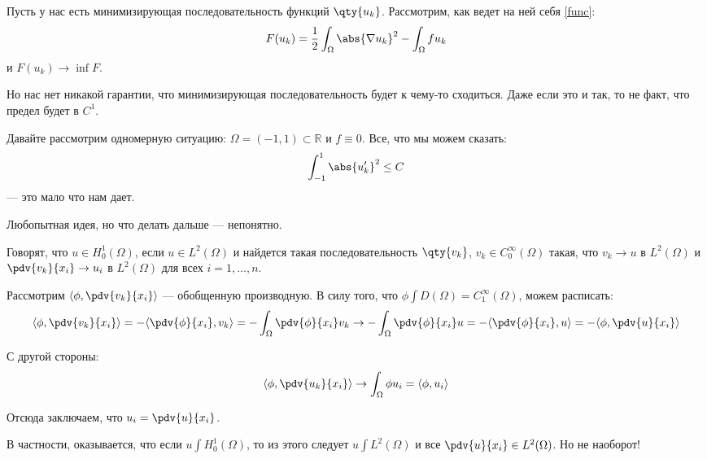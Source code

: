 Пусть у нас есть минимизирующая последовательность функций $\qty{u_k}$. Рассмотрим, как ведет на ней себя \eqref{func}:
\begin{equation}
  F(u_k) = \frac{1}{2} \int_\Omega \abs{\nabla u_k}^2 - \int_\Omega f u_k
\end{equation}
и $F(u_k) \to \inf F$. 

Но нас нет никакой гарантии, что минимизирующая последовательность будет к чему-то сходиться. Даже если это и так, то не факт, что предел будет в $C^1$.

Давайте рассмотрим одномерную ситуацию: $\Omega = (-1, 1) \subset \mathbb{R}$ и $f \equiv 0$. Все, что мы можем сказать:
\begin{equation}
  \int_{-1}^1 \abs{u'_k}^2 \le C
\end{equation}
%
--- это мало что нам дает. 

Любопытная идея, но что делать дальше --- непонятно.

\bigskip

\begin{defn}
  Говорят, что $u \in H_0^1 (\Omega)$, если $u \in L^2(\Omega)$ и найдется такая последовательность $\qty{v_k}$, $v_k \in C_0^\infty(\Omega)$ такая, что $v_k \to u$ в $L^2(\Omega)$ и $\pdv{v_k}{x_i} \to u_i$ в $L^2(\Omega)$ для всех $i = 1, \ldots, n$.
\end{defn}

Рассмотрим $\langle \phi, \pdv{v_k}{x_i} \rangle$ --- обобщенную производную. В силу того, что $\phi \int D(\Omega) = C_1^\infty(\Omega)$, можем расписать:
\begin{equation}
  \langle \phi, \pdv{v_k}{x_i} \rangle = -\langle \pdv{\phi}{x_i}, v_k \rangle = - \int_\Omega \pdv{\phi}{x_i} v_k \to - \int_\Omega \pdv{\phi}{x_i} u = - \langle \pdv{\phi}{x_i}, u \rangle = - \langle \phi, \pdv{u}{x_i} \rangle
\end{equation}

С другой стороны:
\begin{equation}
  \langle \phi, \pdv{u_k}{x_i} \rangle \to \int_\Omega \phi u_i = \langle \phi, u_i \rangle
\end{equation}

Отсюда заключаем, что $u_i = \pdv{u}{x_i}$.


В частности, оказывается, что если $u \int H_0^1(\Omega)$, то из этого следует $u \int L^2(\Omega)$ и все $\pdv{u}{x_i} \in L^2(\Omega)$. Но не наоборот!

